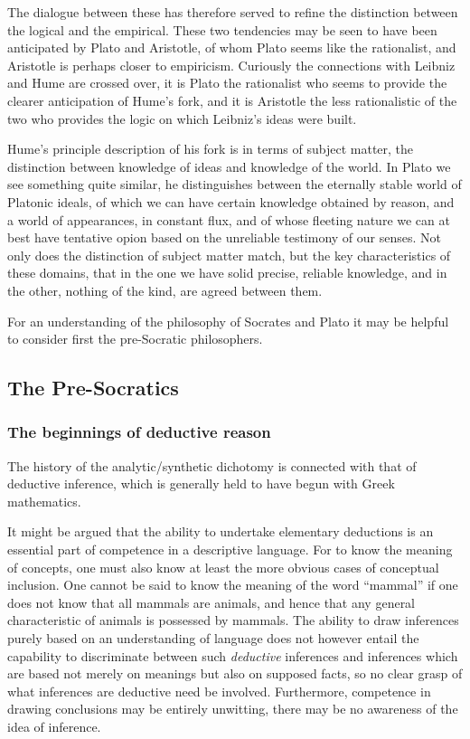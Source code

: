 The dialogue between these has therefore served to refine the distinction between the logical and the empirical.
These two tendencies may be seen to have been anticipated by Plato and Aristotle, of whom Plato seems like the rationalist, and Aristotle is perhaps closer to empiricism.
Curiously the connections with Leibniz and Hume are crossed over, it
is Plato the rationalist who seems to provide the clearer anticipation
of Hume's fork, and it is Aristotle the less rationalistic of the two
who provides the logic on which Leibniz's ideas were built.

Hume's principle description of his fork is in terms of subject matter, the distinction between knowledge of ideas and knowledge of the world. 
In Plato we see something quite similar, he distinguishes between the eternally stable world of Platonic ideals, of which we can have certain knowledge obtained by reason, and a world of appearances, in constant flux, and of whose fleeting nature we can at best have tentative opion based on the unreliable testimony of our senses.
Not only does the distinction of subject matter match, but the key characteristics of these domains, that in the one we have solid precise, reliable knowledge, and in the other, nothing of the kind, are agreed between them.

For an understanding of the philosophy of Socrates and Plato it may be helpful to consider first the pre-Socratic philosophers.

\subsection{The Pre-Socratics}

\subsubsection{The beginnings of deductive reason}

The history of the analytic/\-synthetic dichotomy is connected with that
of deductive inference, which is generally held to have begun with
Greek mathematics.

It might be argued that the ability to undertake elementary
deductions is an essential part of competence in a descriptive
language.
For to know the meaning of concepts, one must also know at least the
more obvious cases of conceptual inclusion.
One cannot be said to know the meaning of the word ``mammal'' if one
does not know that all mammals are animals, and hence that any general
characteristic of animals is possessed by mammals.
The ability to draw inferences purely based on an understanding of
language does not however entail the capability to discriminate
between such \emph{deductive} inferences and inferences which are
based not merely on meanings but also on supposed facts, so no clear
grasp of what inferences are deductive need be involved.
Furthermore, competence in drawing conclusions may be entirely
unwitting, there may be no awareness of the idea of inference.

